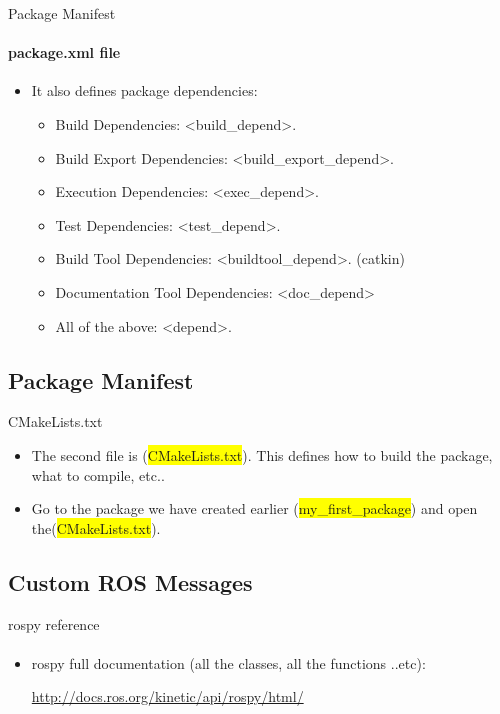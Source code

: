 \documentclass{beamer}
\begin{document}
   \begin{frame}{Package Manifest}
       \framesubtitle{package.xml file}    
    \begin{itemize}
        \item It also defines package dependencies:
        \begin{itemize}
            \item  Build Dependencies: {\color{red}<build\_depend>}.
            \item Build Export Dependencies: {\color{red}<build\_export\_depend>}.
            \item Execution Dependencies: {\color{red}<exec\_depend>}.
            \item Test Dependencies: {\color{red}<test\_depend>}.
            \item Build Tool Dependencies: {\color{red}<buildtool\_depend>}. (catkin)
            \item Documentation Tool Dependencies: {\color{red}<doc\_depend>}
            \item All of the above: {\color{red}<depend>}.
        \end{itemize}
    \end{itemize}
    
\end{frame}




\subsection{Package Manifest}

\begin{frame}{CMakeLists.txt}
    
    \begin{itemize}
        \item The second file is ({\ttfamily \colorbox{yellow}{CMakeLists.txt}}). This defines how to build the package, what to compile, etc..
        \item Go to the package we have created earlier ({\ttfamily \colorbox{yellow}{my\_first\_package}}) and open the({\ttfamily \colorbox{yellow}{CMakeLists.txt}}).
    \end{itemize}
\end{frame}




\subsection{Custom ROS Messages}




    

\begin{frame}[fragile]{rospy reference}
    \framesubtitle{}

\begin{itemize}
    \item rospy full documentation (all the classes, all the functions ..etc):
    
    \vspace{0.5cm}
     \url{http://docs.ros.org/kinetic/api/rospy/html/}
\end{itemize}
    
\end{frame}
\end{document}
